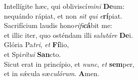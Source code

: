 \oddverse Intellígite hæc, qui obliviscí\textit{mi}\textit{ni} \textbf{De}um:~\*\\
\oddverse nequándo rápiat, et non \textit{sit} \textit{qui} \textit{e}\textbf{rí}piat.\\
\evenverse Sacrifícium laudis hono\textit{ri}\textit{fi}\textbf{cá}bit me:~\*\\
\evenverse et illic iter, quo osténdam illi sa\textit{lu}\textit{tá}\textit{re} \textbf{De}i.\\
\oddverse Glória Pa\textit{tri}, \textit{et} \textbf{Fí}lio,~\*\\
\oddverse et Spi\textit{rí}\textit{tu}\textit{i} \textbf{San}cto.\\
\evenverse Sicut erat in princípio, et \textit{nunc}, \textit{et} \textbf{sem}per,~\*\\
\evenverse et in sǽcula sæ\textit{cu}\textit{ló}\textit{rum}. \textbf{A}men.\\
